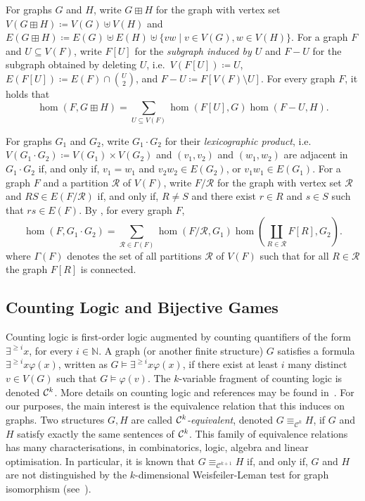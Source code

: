 \documentclass[11pt, DIV=15]{scrarticle}
\theoremstyle{definition}
\theoremstyle{plain}
\theoremstyle{remark}
\newcommand{\Cc}{{\cal C}}
\renewcommand{\phi}{\varphi}
\newcommand{\bbN}{\mathbb{N}}
\begin{document}
For graphs $G$ and $H$, write $G \boxplus H$ for the graph with vertex set $V(G \boxplus H) \coloneqq V(G) \uplus V(H)$ and $E(G \boxplus H) \coloneqq E(G) \uplus E(H) \uplus \{vw \mid v \in V(G), w\in V(H)\}$.
For a graph $F$ and $U \subseteq V(F)$,
write $F[U]$ for the \emph{subgraph induced by $U$} and $F -U$ for the subgraph obtained by deleting $U$, i.e.\ $V(F[U]) \coloneqq U$, $E(F[U]) \coloneqq E(F) \cap \binom{U}{2}$, and $F-U \coloneqq F[V(F) \setminus U]$.
For every graph $F$, it holds that
\begin{equation}\label{eq:boxplus}
	\hom(F, G \boxplus H) = \sum_{U \subseteq V(F)} \hom(F[U], G) \hom(F -U, H).
\end{equation}

For graphs $G_1$ and $G_2$, write $G_1 \cdot G_2$ for their \emph{lexicographic product}, i.e.\ $V(G_1 \cdot G_2) \coloneqq V(G_1) \times V(G_2)$ and $(v_1, v_2)$ and $(w_1, w_2)$ are adjacent in $G_1 \cdot G_2$ if, and only if, $v_1 = w_1$ and $v_2w_2 \in E(G_2)$, or $v_1w_1 \in E(G_1)$.
For a graph $F$ and a partition $\mathcal{R}$ of $V(F)$,
write $F/\mathcal{R}$ for the graph with vertex set $\mathcal{R}$ and $RS \in E(F/\mathcal{R})$ if, and only if, $R \neq S$ and there exist $r \in R$ and $s \in S$ such that $rs \in E(F)$.
By \cite[Theorem~16]{seppelt_logical_2024},
for every graph $F$,
\begin{equation}\label{eq:lexprod}
	\hom(F, G_1 \cdot G_2) = \sum_{\mathcal{R} \in \Gamma(F)} \hom(F/\mathcal{R}, G_1) \hom(\coprod_{R \in \mathcal{R}} F[R], G_2).
\end{equation}	
where $\Gamma(F)$ denotes the set of all partitions $\mathcal{R}$ of $V(F)$ such that for all $R \in \mathcal{R}$ the graph $F[R]$ is connected.

\subsection{Counting Logic and Bijective Games}        


Counting logic is first-order logic
augmented by counting quantifiers of the form $\exists^{\geq i} x$,
for every $i \in \bbN$. A graph (or another finite structure) $G$
satisfies a formula $\exists^{\geq i} x \phi(x)$, written as $G
\models \exists^{\geq i} x \phi(x)$, if there exist at least $i$ many
distinct $v \in V(G)$ such that $G \models \phi(v)$. The $k$-variable
fragment of counting logic is denoted $\Cc^k$.
More details on counting logic and references may be found
in~\cite{dawar_siglog15}.  For our purposes, the main interest is the
equivalence relation that this induces on graphs.  Two structures $G,H$
are called \emph{$\Cc^k$-equivalent}, denoted $G
\equiv_{\mathcal{C}^k} H$, if $G$ and $H$ satisfy exactly the same
sentences of $\Cc^k$.  This family of equivalence relations has many
characterisations, in combinatorics, logic, algebra and linear
optimisation.  In particular, it is known that $G
\equiv_{\mathcal{C}^{k+1}} H$ if, and only if, $G$ and $H$ are not
distinguished by the $k$-dimensional Weisfeiler-Leman test for graph
isomorphism (see~\cite{CFI}).
\end{document}
